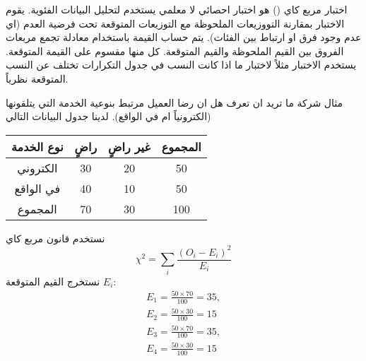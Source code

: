 		\begin{frame}
			\begin{exampleblock}{اختبار مربع كاي ()}
				هو اختبار احصائي لا معلمي يستخدم لتحليل البيانات الفئوية. يقوم الاختبار بمقارنة التووزيعات الملحوظة مع التوزيعات المتوقعة تحت فرضية العدم (اي عدم وجود فرق او ارتباط بين الفئات). يتم حساب القيمة باستخدام معادلة تجمع مربعات الفروق بين القيم الملحوظة والقيم المتوقعة. كل منها مقسوم على القيمة المتوقعة. يستخدم الاختبار مثلاً لاختبار ما اذا كانت النسب في جدول التكرارات تختلف عن النسب المتوقعة نظرياً.
			\end{exampleblock}
			
			\pause
			\begin{exampleblock}{مثال}
				شركة ما تريد ان تعرف هل ان رضا العميل مرتبط بنوعية الخدمة التي يتلقونها (الكترونياً ام في الواقع). لدينا جدول البيانات التالي
				
				\begin{table}[H]
					\centering
					\begin{tabular}{| c| c| c| c|}
						\hline
						نوع الخدمة & راضٍ & غير راضٍ & المجموع \\
						\hline 
						الكتروني & 30 & 20 & 50 \\
						\hline
						في الواقع & 40 & 10 & 50 \\
						\hline
						المجموع & 70 & 30 &100\\
						\hline
					\end{tabular}
				\end{table}
			\end{exampleblock}
		\end{frame}
		
		\begin{frame}
		\begin{exampleblock}{}
				نستخدم قانون مربع كاي
				\[
				\chi^2 = \sum_i \frac{(O_i - E_i)^2}{E_i} 
				\]
				نستخرج القيم المتوقعة $E_i$:
				\begin{align*}
					E_1 = \frac{50\times 70}{100} = 35, \\
					E_2 = \frac{50\times30}{100} = 15\\
					E_3 = \frac{50\times70}{100} = 35, \\
					E_4 = \frac{50\times30}{100} = 15\\
				\end{align*}
			\end{exampleblock}
		\end{frame}
		
